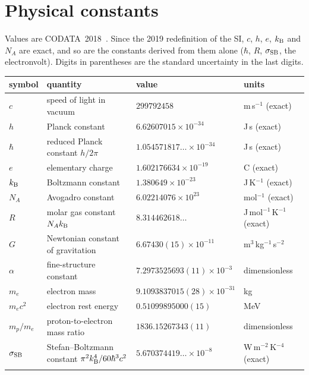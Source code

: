 \section{Physical constants}
Values are CODATA~2018~\cite{CODATA2018}. Since the 2019 redefinition of the SI, $c$, $h$, $e$, $k_{\mathrm B}$ and $N_A$ are exact, and so are the constants derived
from them alone ($\hbar$, $R$, $\sigma_{\rm SB}$, the electronvolt). Digits in parentheses are the standard uncertainty in the last digits.
{\small\begin{longtable}{@{}>{\raggedright\arraybackslash}p{}>{\raggedright\arraybackslash}p{}>{\raggedright\arraybackslash}p{}>{\raggedright\arraybackslash}p{}@{}}
\toprule symbol & quantity & value & units\\\midrule\endhead
$c$ & speed of light in vacuum & $299792458$ & m\,s$^{-1}$ (exact)\\\iamrowrule
$h$ & Planck constant & $6.62607015\times10^{-34}$ & J\,s (exact)\\\iamrowrule
$\hbar$ & reduced Planck constant $h/2\pi$ & $1.054571817\ldots\times10^{-34}$ & J\,s (exact)\\\iamrowrule
$e$ & elementary charge & $1.602176634\times10^{-19}$ & C (exact)\\\iamrowrule
$k_{\mathrm B}$ & Boltzmann constant & $1.380649\times10^{-23}$ & J\,K$^{-1}$ (exact)\\\iamrowrule
$N_A$ & Avogadro constant & $6.02214076\times10^{23}$ & mol$^{-1}$ (exact)\\\iamrowrule
$R$ & molar gas constant $N_Ak_{\mathrm B}$ & $8.314462618\ldots$ & J\,mol$^{-1}$\,K$^{-1}$ (exact)\\\iamrowrule
$G$ & Newtonian constant of gravitation & $6.67430(15)\times10^{-11}$ & m$^3$\,kg$^{-1}$\,s$^{-2}$\\\iamrowrule
$\alpha$ & fine-structure constant & $7.2973525693(11)\times10^{-3}$ & dimensionless\\\iamrowrule
$m_e$ & electron mass & $9.1093837015(28)\times10^{-31}$ & kg\\\iamrowrule
$m_ec^2$ & electron rest energy & $0.51099895000(15)$ & MeV\\\iamrowrule
$m_p/m_e$ & proton-to-electron mass ratio & $1836.15267343(11)$ & dimensionless\\\iamrowrule
$\sigma_{\rm SB}$ & Stefan--Boltzmann constant $\pi^2k_{\mathrm B}^4/60\hbar^3c^2$ & $5.670374419\ldots\times10^{-8}$ & W\,m$^{-2}$\,K$^{-4}$ (exact)\\\iamrowrule

\end{longtable}}
